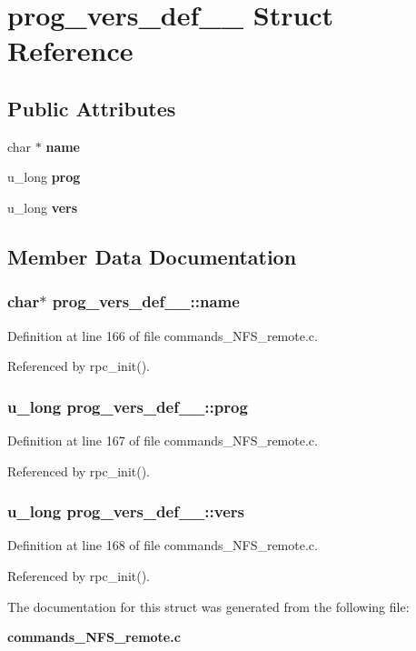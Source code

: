 \section{prog\_\-vers\_\-def\_\-\_\- Struct Reference}
\label{structprog__vers__def____}
\subsection*{Public Attributes}
\begin{CompactItemize}
\item 
char $\ast$ {\bf name}
\item 
u\_\-long {\bf prog}
\item 
u\_\-long {\bf vers}
\end{CompactItemize}


\subsection{Member Data Documentation}
\subsubsection{\setlength{\rightskip}{0pt plus 5cm}char$\ast$ {\bf prog\_\-vers\_\-def\_\-\_\-::name}}\label{structprog__vers__def_____o0}




Definition at line 166 of file commands\_\-NFS\_\-remote.c.

Referenced by rpc\_\-init().
\subsubsection{\setlength{\rightskip}{0pt plus 5cm}u\_\-long {\bf prog\_\-vers\_\-def\_\-\_\-::prog}}\label{structprog__vers__def_____o1}




Definition at line 167 of file commands\_\-NFS\_\-remote.c.

Referenced by rpc\_\-init().
\subsubsection{\setlength{\rightskip}{0pt plus 5cm}u\_\-long {\bf prog\_\-vers\_\-def\_\-\_\-::vers}}\label{structprog__vers__def_____o2}




Definition at line 168 of file commands\_\-NFS\_\-remote.c.

Referenced by rpc\_\-init().

The documentation for this struct was generated from the following file:\begin{CompactItemize}
\item 
{\bf commands\_\-NFS\_\-remote.c}\end{CompactItemize}
